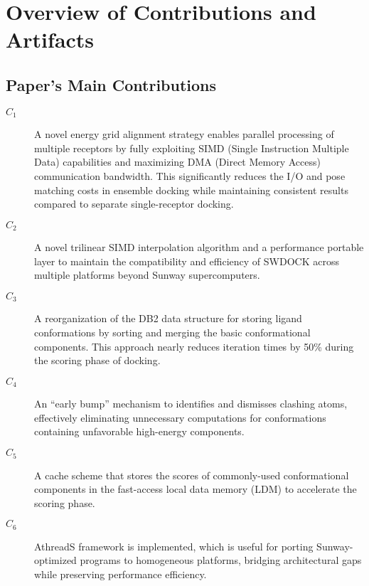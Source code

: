 \documentclass[nonacm,sigconf]{acmart}
\begin{document}


\appendixAD

\section{Overview of Contributions and Artifacts}

\subsection{Paper's Main Contributions}
\begin{description}
\item[$C_1$] A novel energy grid alignment strategy enables parallel processing of multiple receptors by fully exploiting SIMD (Single Instruction Multiple Data) capabilities and maximizing DMA (Direct Memory Access) communication bandwidth. This significantly reduces the I/O and pose matching costs in ensemble docking while maintaining consistent results compared to separate single-receptor docking.

\item[$C_2$] A novel trilinear SIMD interpolation algorithm and a performance portable layer to maintain the compatibility and efficiency of SWDOCK across multiple platforms beyond Sunway supercomputers.

\item[$C_3$] A reorganization of the DB2 data structure for storing ligand conformations by sorting and merging the basic conformational components. This approach nearly reduces iteration times by 50\% during the scoring phase of docking.

\item[$C_4$] An ``early bump'' mechanism to identifies and dismisses clashing atoms, effectively eliminating unnecessary computations for conformations containing unfavorable high-energy components.

\item[$C_5$] A cache scheme that stores the scores of commonly-used conformational components in the fast-access local data memory (LDM) to accelerate the scoring phase.

\item[$C_6$] AthreadS framework is implemented, which is useful for porting Sunway-optimized programs to homogeneous platforms, bridging architectural gaps while preserving performance efficiency.
\end{description}
\end{document}
